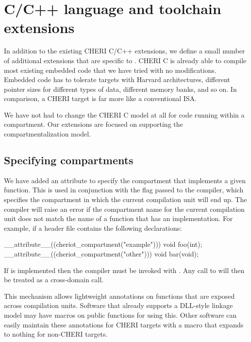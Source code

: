 \chapter{C/C++ language and toolchain extensions}
\label{chap:language}

In addition to the existing CHERI C/C++ extensions, we define a small number of additional extensions that are specific to \cherimcu{}.
CHERI C is already able to compile most existing embedded code that we have tried with no modifications.
Embedded code has to tolerate targets with Harvard architectures, different pointer sizes for different types of data, different memory banks, and so on.
In comparison, a CHERI target is far more like a conventional ISA.

We have not had to change the CHERI C model at all for code running within a compartment.
Our extensions are focused on supporting the compartmentalization model.

\section{Specifying compartments}

We have added an attribute to specify the compartment that implements a given function.
This is used in conjunction with the  flag passed to the compiler, which specifies the compartment in which the current compilation unit will end up.
The compiler will raise an error if the compartment name for the current compilation unit does not match the name of a function that has an implementation.
For example, if a header file contains the following declarations:

\begin{ccodelisting}
__attribute__((cheriot_compartment("example"))) void foo(int);
__attribute__((cheriot_compartment("other"))) void bar(void);
\end{ccodelisting}

If  is implemented then the compiler must be invoked with .
Any call to  will then be treated as a cross-domain call.

This mechanism allows lightweight annotations on functions that are exposed across compilation units.
Software that already supports a DLL-style linkage model may have macros on public functions for using this.
Other software can easily maintain these annotations for CHERI targets with a macro that expands to nothing for non-CHERI targets.

